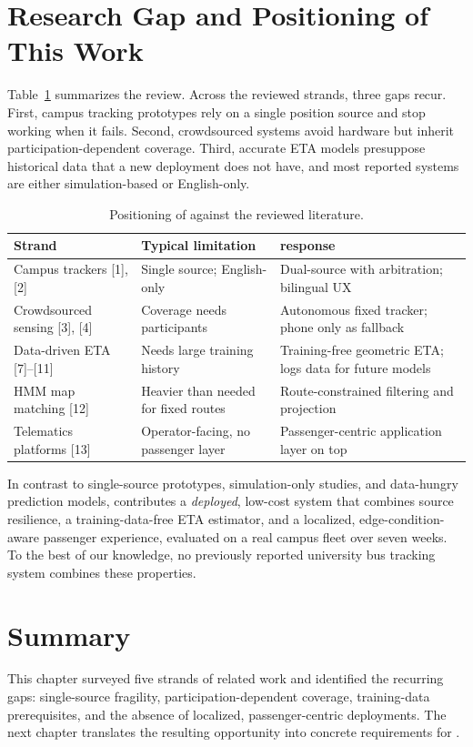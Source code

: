 \section{Research Gap and Positioning of This Work}
\label{sec:lit-gap}
Table~\ref{tab:lit-compare} summarizes the review. Across the reviewed
strands, three gaps recur. First, campus tracking prototypes rely on a
single position source and stop working when it fails. Second,
crowdsourced systems avoid hardware but inherit participation-dependent
coverage. Third, accurate ETA models presuppose historical data that a new
deployment does not have, and most reported systems are either
simulation-based or English-only.

\begin{table}[H]
\caption{Positioning of \system{} against the reviewed literature.}
\label{tab:lit-compare}
\centering
\small
\begin{tabular}{@{}p{4.6cm}p{4.5cm}p{4.6cm}@{}}
\toprule
\textbf{Strand} & \textbf{Typical limitation} & \textbf{\system{} response} \\
\midrule
Campus trackers [1], [2] & Single source; English-only &
Dual-source with arbitration; bilingual UX \\
Crowdsourced sensing [3], [4] & Coverage needs participants &
Autonomous fixed tracker; phone only as fallback \\
Data-driven ETA [7]--[11] & Needs large training history &
Training-free geometric ETA; logs data for future models \\
HMM map matching [12] & Heavier than needed for fixed routes &
Route-constrained filtering and projection \\
Telematics platforms [13] & Operator-facing, no passenger layer &
Passenger-centric application layer on top \\
\bottomrule
\end{tabular}
\end{table}

In contrast to single-source prototypes, simulation-only studies, and
data-hungry prediction models, \system{} contributes a \emph{deployed},
low-cost system that combines source resilience, a training-data-free ETA
estimator, and a localized, edge-condition-aware passenger experience,
evaluated on a real campus fleet over seven weeks. To the best of our
knowledge, no previously reported university bus tracking system combines
these properties.

\section{Summary}
This chapter surveyed five strands of related work and identified the
recurring gaps: single-source fragility, participation-dependent
coverage, training-data prerequisites, and the absence of localized,
passenger-centric deployments. The next chapter translates the resulting
opportunity into concrete requirements for \system{}.
